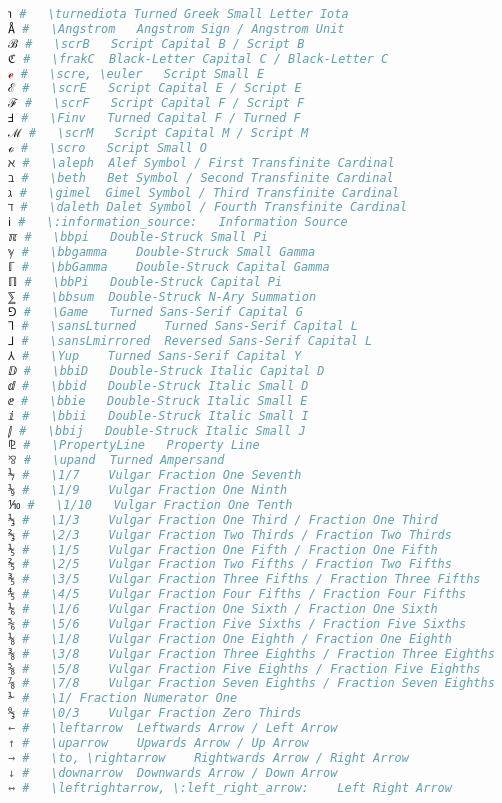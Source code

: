\begin{lstlisting}[language=Julia, linewidth=\textwidth]
℩ #   \turnediota Turned Greek Small Letter Iota
Å #   \Angstrom   Angstrom Sign / Angstrom Unit
ℬ #   \scrB   Script Capital B / Script B
ℭ #   \frakC  Black-Letter Capital C / Black-Letter C
ℯ #   \scre, \euler   Script Small E
ℰ #   \scrE   Script Capital E / Script E
ℱ #   \scrF   Script Capital F / Script F
Ⅎ #   \Finv   Turned Capital F / Turned F
ℳ #   \scrM   Script Capital M / Script M
ℴ #   \scro   Script Small O
ℵ #   \aleph  Alef Symbol / First Transfinite Cardinal
ℶ #   \beth   Bet Symbol / Second Transfinite Cardinal
ℷ #   \gimel  Gimel Symbol / Third Transfinite Cardinal
ℸ #   \daleth Dalet Symbol / Fourth Transfinite Cardinal
ℹ #   \:information_source:   Information Source
ℼ #   \bbpi   Double-Struck Small Pi
ℽ #   \bbgamma    Double-Struck Small Gamma
ℾ #   \bbGamma    Double-Struck Capital Gamma
ℿ #   \bbPi   Double-Struck Capital Pi
⅀ #   \bbsum  Double-Struck N-Ary Summation
⅁ #   \Game   Turned Sans-Serif Capital G
⅂ #   \sansLturned    Turned Sans-Serif Capital L
⅃ #   \sansLmirrored  Reversed Sans-Serif Capital L
⅄ #   \Yup    Turned Sans-Serif Capital Y
ⅅ #   \bbiD   Double-Struck Italic Capital D
ⅆ #   \bbid   Double-Struck Italic Small D
ⅇ #   \bbie   Double-Struck Italic Small E
ⅈ #   \bbii   Double-Struck Italic Small I
ⅉ #   \bbij   Double-Struck Italic Small J
⅊ #   \PropertyLine   Property Line
⅋ #   \upand  Turned Ampersand
⅐ #   \1/7    Vulgar Fraction One Seventh
⅑ #   \1/9    Vulgar Fraction One Ninth
⅒ #   \1/10   Vulgar Fraction One Tenth
⅓ #   \1/3    Vulgar Fraction One Third / Fraction One Third
⅔ #   \2/3    Vulgar Fraction Two Thirds / Fraction Two Thirds
⅕ #   \1/5    Vulgar Fraction One Fifth / Fraction One Fifth
⅖ #   \2/5    Vulgar Fraction Two Fifths / Fraction Two Fifths
⅗ #   \3/5    Vulgar Fraction Three Fifths / Fraction Three Fifths
⅘ #   \4/5    Vulgar Fraction Four Fifths / Fraction Four Fifths
⅙ #   \1/6    Vulgar Fraction One Sixth / Fraction One Sixth
⅚ #   \5/6    Vulgar Fraction Five Sixths / Fraction Five Sixths
⅛ #   \1/8    Vulgar Fraction One Eighth / Fraction One Eighth
⅜ #   \3/8    Vulgar Fraction Three Eighths / Fraction Three Eighths
⅝ #   \5/8    Vulgar Fraction Five Eighths / Fraction Five Eighths
⅞ #   \7/8    Vulgar Fraction Seven Eighths / Fraction Seven Eighths
⅟ #   \1/ Fraction Numerator One
↉ #   \0/3    Vulgar Fraction Zero Thirds
← #   \leftarrow  Leftwards Arrow / Left Arrow
↑ #   \uparrow    Upwards Arrow / Up Arrow
→ #   \to, \rightarrow    Rightwards Arrow / Right Arrow
↓ #   \downarrow  Downwards Arrow / Down Arrow
↔ #   \leftrightarrow, \:left_right_arrow:    Left Right Arrow

\end{lstlisting}
